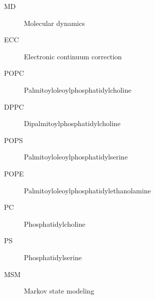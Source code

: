 \documentclass[12pt,a4paper]{report}
\begin{document}
\newlength{\figwidth}
\setlength{\figwidth}{6 cm} 




\tableofcontents










\listoffigures

\listoftables


\begin{description}   %
\item [MD]   Molecular dynamics
\item [ECC]  Electronic continuum correction
\item [POPC] Palmitoyloleoylphosphatidylcholine
\item [DPPC] Dipalmitoylphosphatidylcholine
\item [POPS] Palmitoyloleoylphosphatidylserine
\item [POPE] Palmitoyloleoylphosphatidylethanolamine
\item [PC]   Phosphatidylcholine
\item [PS]   Phosphatidylserine
\item [MSM]  Markov state modeling
\end{description}


\appendix
\end{document}
